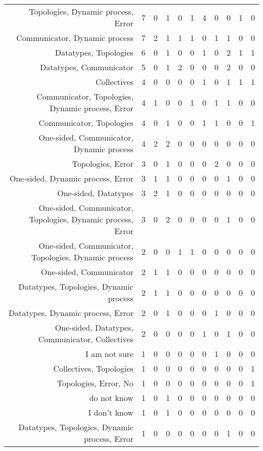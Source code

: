 {\begin{landscape}
\begin{longtable}[htb]{r|c|c|c|c|c|c|c|c|c|c}
{Topologies, Dynamic process, Error} & 7 & 0 & 1 & 0 & 1 & 4 & 0 & 0 & 1 & 0 \\%
{Communicator, Dynamic process} & 7 & 2 & 1 & 1 & 1 & 0 & 1 & 1 & 0 & 0 \\%
{Datatypes, Topologies} & 6 & 0 & 1 & 0 & 0 & 1 & 0 & 2 & 1 & 1 \\%
{Datatypes, Communicator} & 5 & 0 & 1 & 2 & 0 & 0 & 0 & 2 & 0 & 0 \\%
{Collectives} & 4 & 0 & 0 & 0 & 0 & 1 & 0 & 1 & 1 & 1 \\%
{Communicator, Topologies, Dynamic process, Error} & 4 & 1 & 0 & 0 & 1 & 0 & 1 & 1 & 0 & 0 \\%
{Communicator, Topologies} & 4 & 0 & 1 & 0 & 0 & 1 & 1 & 0 & 0 & 1 \\%
{One-sided, Communicator, Dynamic process} & 4 & 2 & 2 & 0 & 0 & 0 & 0 & 0 & 0 & 0 \\%
{Topologies, Error} & 3 & 0 & 1 & 0 & 0 & 0 & 2 & 0 & 0 & 0 \\%
{One-sided, Dynamic process, Error} & 3 & 1 & 1 & 0 & 0 & 0 & 0 & 1 & 0 & 0 \\%
{One-sided, Datatypes} & 3 & 2 & 1 & 0 & 0 & 0 & 0 & 0 & 0 & 0 \\%
{One-sided, Communicator, Topologies, Dynamic process, Error} & 3 & 0 & 2 & 0 & 0 & 0 & 0 & 1 & 0 & 0 \\%
{One-sided, Communicator, Topologies, Dynamic process} & 2 & 0 & 0 & 1 & 1 & 0 & 0 & 0 & 0 & 0 \\%
{One-sided, Communicator} & 2 & 1 & 1 & 0 & 0 & 0 & 0 & 0 & 0 & 0 \\%
{Datatypes, Topologies, Dynamic process} & 2 & 1 & 1 & 0 & 0 & 0 & 0 & 0 & 0 & 0 \\%
{Datatypes, Dynamic process, Error} & 2 & 0 & 1 & 0 & 0 & 0 & 1 & 0 & 0 & 0 \\%
{One-sided, Datatypes, Communicator, Collectives} & 2 & 0 & 0 & 0 & 0 & 1 & 0 & 1 & 0 & 0 \\%
{I am not sure} & 1 & 0 & 0 & 0 & 0 & 0 & 1 & 0 & 0 & 0 \\%
{Collectives, Topologies} & 1 & 0 & 0 & 0 & 0 & 0 & 0 & 0 & 0 & 1 \\%
{Topologies, Error, No} & 1 & 0 & 0 & 0 & 0 & 0 & 0 & 0 & 0 & 1 \\%
{do not know} & 1 & 0 & 1 & 0 & 0 & 0 & 0 & 0 & 0 & 0 \\%
{I don't know} & 1 & 0 & 1 & 0 & 0 & 0 & 0 & 0 & 0 & 0 \\%
{Datatypes, Topologies, Dynamic process, Error} & 1 & 0 & 0 & 0 & 0 & 0 & 0 & 1 & 0 & 0 \\%

\end{longtable}
\end{landscape}}
